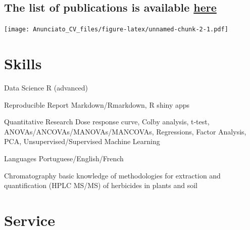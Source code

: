 \documentclass[11pt, a4paper]{awesome-cv}
\begin{document}
\hypertarget{the-list-of-publications-is-available-here-1}{%
\subsection{\texorpdfstring{The list of publications is available
\href{https://github.com/vitoranunciato/MyCV}{here}}{The list of publications is available here}}\label{the-list-of-publications-is-available-here-1}}

\texttt{[image: Anunciato\_CV\_files/figure-latex/unnamed-chunk-2-1.pdf]}

\pagebreak

\hypertarget{skills}{%
\section{Skills}\label{skills}}

\begin{cvskills}
  \cvskill
    {Data Science}
    {R (advanced)}

  \cvskill
    {Reproducible Report}
    {Markdown/Rmarkdown, R shiny apps}

  \cvskill
    {Quantitative Research}
    {Dose response curve, Colby analysis, t‑test, ANOVAs/ANCOVAs/MANOVAs/MANCOVAs,
Regressions, Factor Analysis, PCA, Unsupervised/Supervised Machine Learning}
  
  \cvskill
    {Languages}
    {Portuguese/English/French}

  \cvskill
    {Chromatography}
    {basic knowledge of methodologies for extraction and quantification (HPLC MS/MS) of 
    herbicides in plants and soil}

\end{cvskills}

\hypertarget{service}{%
\section{Service}\label{service}}
\end{document}
